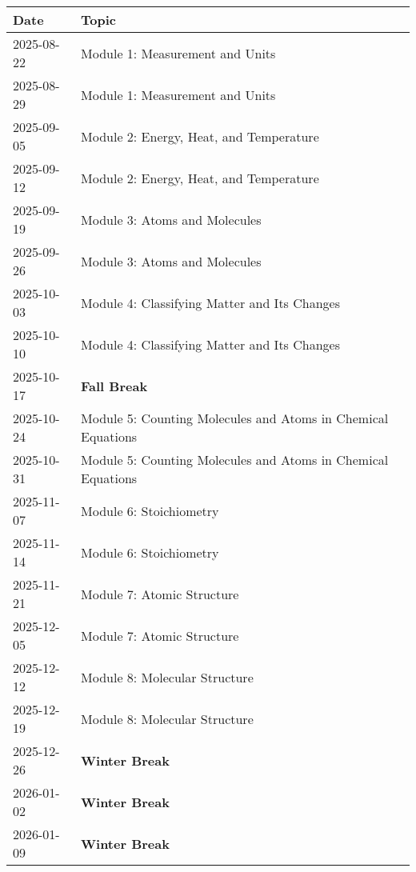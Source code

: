 \documentclass[11pt, oneside]{article}   	%
\begin{document}
\begin{table}[h]
\centering
\begin{tabular}{ l | l }
Date & Topic \\
\hline
2025-08-22 & Module 1:  Measurement and Units \\
2025-08-29 & Module 1:  Measurement and Units \\
2025-09-05 & Module 2: Energy, Heat, and Temperature \\
2025-09-12 & Module 2: Energy, Heat, and Temperature \\
2025-09-19 & Module 3: Atoms and Molecules \\
2025-09-26 & Module 3: Atoms and Molecules \\
2025-10-03 & Module 4: Classifying Matter and Its Changes \\
2025-10-10 & Module 4: Classifying Matter and Its Changes \\

2025-10-17 & \textbf{Fall Break} \\

2025-10-24 & Module 5: Counting Molecules and Atoms in Chemical Equations \\
2025-10-31 & Module 5: Counting Molecules and Atoms in Chemical Equations \\
2025-11-07 & Module 6: Stoichiometry \\
2025-11-14 & Module 6: Stoichiometry \\
2025-11-21 & Module 7: Atomic Structure \\
2025-12-05 & Module 7: Atomic Structure \\
2025-12-12 & Module 8: Molecular Structure \\
2025-12-19 & Module 8: Molecular Structure \\

2025-12-26  & \textbf{Winter Break} \\
2026-01-02  & \textbf{Winter Break} \\
2026-01-09  & \textbf{Winter Break} \\


\end{tabular}
\end{table}
\end{document}
